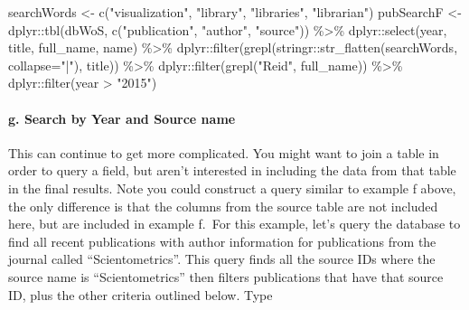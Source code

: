 \documentclass[
]{article}
\newenvironment{Shaded}{\begin{snugshade}}{\end{snugshade}}
\newcommand{\AttributeTok}[1]{\textcolor[rgb]{0.77,0.63,0.00}{#1}}
\newcommand{\FunctionTok}[1]{\textcolor[rgb]{0.00,0.00,0.00}{#1}}
\newcommand{\NormalTok}[1]{#1}
\newcommand{\OtherTok}[1]{\textcolor[rgb]{0.56,0.35,0.01}{#1}}
\newcommand{\SpecialCharTok}[1]{\textcolor[rgb]{0.00,0.00,0.00}{#1}}
\newcommand{\StringTok}[1]{\textcolor[rgb]{0.31,0.60,0.02}{#1}}
\begin{document}
\begin{Shaded}
\begin{Highlighting}[]
\NormalTok{searchWords }\OtherTok{\textless{}{-}} \FunctionTok{c}\NormalTok{(}\StringTok{"visualization"}\NormalTok{, }\StringTok{"library"}\NormalTok{, }\StringTok{"libraries"}\NormalTok{, }\StringTok{"librarian"}\NormalTok{)}
\NormalTok{pubSearchF }\OtherTok{\textless{}{-}}\NormalTok{ dplyr}\SpecialCharTok{::}\FunctionTok{tbl}\NormalTok{(dbWoS, }\FunctionTok{c}\NormalTok{(}\StringTok{"publication"}\NormalTok{, }\StringTok{"author"}\NormalTok{, }\StringTok{"source"}\NormalTok{)) }\SpecialCharTok{\%\textgreater{}\%}
\NormalTok{  dplyr}\SpecialCharTok{::}\FunctionTok{select}\NormalTok{(year, title, full\_name, name) }\SpecialCharTok{\%\textgreater{}\%}
\NormalTok{  dplyr}\SpecialCharTok{::}\FunctionTok{filter}\NormalTok{(}\FunctionTok{grepl}\NormalTok{(stringr}\SpecialCharTok{::}\FunctionTok{str\_flatten}\NormalTok{(searchWords, }\AttributeTok{collapse=}\StringTok{"|"}\NormalTok{), title)) }\SpecialCharTok{\%\textgreater{}\%}
\NormalTok{  dplyr}\SpecialCharTok{::}\FunctionTok{filter}\NormalTok{(}\FunctionTok{grepl}\NormalTok{(}\StringTok{"Reid"}\NormalTok{, full\_name)) }\SpecialCharTok{\%\textgreater{}\%}
\NormalTok{  dplyr}\SpecialCharTok{::}\FunctionTok{filter}\NormalTok{(year }\SpecialCharTok{\textgreater{}} \StringTok{"2015"}\NormalTok{)}
\end{Highlighting}
\end{Shaded}

\hypertarget{g.-search-by-year-and-source-name}{%
\paragraph{g. Search by Year and Source
name}\label{g.-search-by-year-and-source-name}}

This can continue to get more complicated. You might want to join a
table in order to query a field, but aren't interested in including the
data from that table in the final results. Note you could construct a
query similar to example f above, the only difference is that the
columns from the source table are not included here, but are included in
example f.~For this example, let's query the database to find all recent
publications with author information for publications from the journal
called ``Scientometrics''. This query finds all the source IDs where the
source name is ``Scientometrics'' then filters publications that have
that source ID, plus the other criteria outlined below. Type
\end{document}
